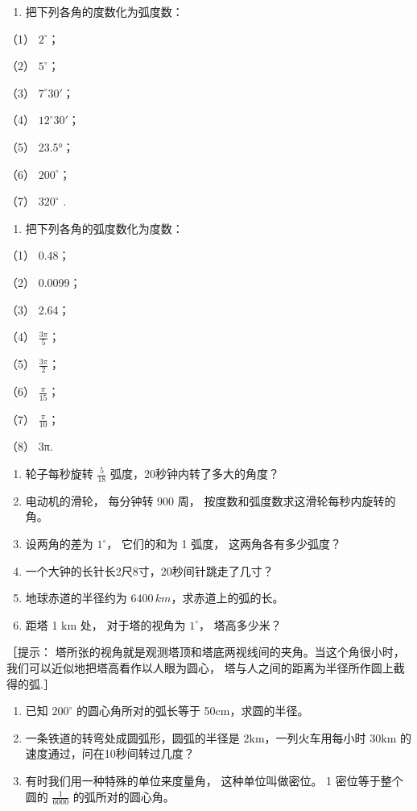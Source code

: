 \begin{enumerate}
\item
  把下列各角的度数化为弧度数：
\end{enumerate}

（1） \(2^{\circ}\)；

（2） \(5^{\circ}\)；

（3） \(7^{\circ}30'\)；

（4） \(12^{\circ}30'\)；

（5） 23.5°；

（6） \(200^{\circ}\)；

（7） \(320^{\circ}\) .

\begin{enumerate}[start=2]
\item
  把下列各角的弧度数化为度数：
\end{enumerate}

（1） 0.48；

（2） 0.0099；

（3） 2.64；

（4） \(\frac{3\pi}{5}\)；

（5） \(\frac{3\pi}{2}\)；

（6） \(\frac{\pi}{15}\)；

（7） \(\frac{\pi}{10}\)；

（8） 3π.

\begin{enumerate}[start=3]
\item
  轮子每秒旋转 \(\frac{5}{18}\) 弧度，20秒钟内转了多大的角度？
\item
  电动机的滑轮， 每分钟转 900 周，
  按度数和弧度数求这滑轮每秒内旋转的角。
\item
  设两角的差为 \(1^{\circ}\)， 它们的和为 1 弧度， 这两角各有多少弧度？
\item
  一个大钟的长针长2尺8寸，20秒间针跳走了几寸？
\item
  地球赤道的半径约为 \(6400 \, km\)，求赤道上的弧的长。
\item
  距塔 1 km 处， 对于塔的视角为 \(1^{\circ}\)， 塔高多少米？
\end{enumerate}

［提示： 塔所张的视角就是观测塔顶和塔底两视线间的夹角。当这个角很小时，
我们可以近似地把塔高看作以人眼为圆心，
塔与人之间的距离为半径所作圆上截得的弧.］

\begin{enumerate}[start=9]
\item
  已知 \(200^{\circ}\) 的圆心角所对的弧长等于 50cm，求圆的半径。
\item
  一条铁道的转弯处成圆弧形，圆弧的半径是
  \(2\mathrm{km}\)，一列火车用每小时 \(30\mathrm{km}\)
  的速度通过，问在10秒间转过几度？
\item
  有时我们用一种特殊的单位来度量角， 这种单位叫做密位。 1
  密位等于整个圆的 \(\frac{1}{6000}\) 的弧所对的圆心角。
\end{enumerate}

